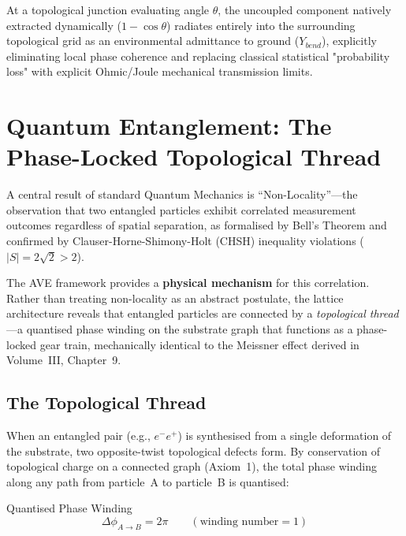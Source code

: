 At a topological junction evaluating angle $\theta$, the uncoupled component natively extracted dynamically ($1 - \cos\theta$) radiates entirely into the surrounding topological grid as an environmental admittance to ground ($Y_{bend}$), explicitly eliminating local phase coherence and replacing classical statistical "probability loss" with explicit Ohmic/Joule mechanical transmission limits.

\section{Quantum Entanglement: The Phase-Locked Topological Thread}
\label{sec:entanglement}
A central result of standard Quantum Mechanics is ``Non-Locality''---the observation that two entangled particles exhibit correlated measurement outcomes regardless of spatial separation, as formalised by Bell's Theorem and confirmed by Clauser-Horne-Shimony-Holt (CHSH) inequality violations ($|S| = 2\sqrt{2} > 2$).

The AVE framework provides a \textbf{physical mechanism} for this correlation. Rather than treating non-locality as an abstract postulate, the lattice architecture reveals that entangled particles are connected by a \textit{topological thread}---a quantised phase winding on the substrate graph that functions as a phase-locked gear train, mechanically identical to the Meissner effect derived in Volume~III, Chapter~9.

\subsection{The Topological Thread}
When an entangled pair (e.g., $e^-e^+$) is synthesised from a single deformation of the substrate, two opposite-twist topological defects form. By conservation of topological charge on a connected graph (Axiom~1), the total phase winding along any path from particle~A to particle~B is quantised:
\begin{resultbox}{Quantised Phase Winding}
\begin{equation}
    \Delta\phi_{A \to B} = 2\pi \qquad (\text{winding number} = 1)
\end{equation}
\end{resultbox}

